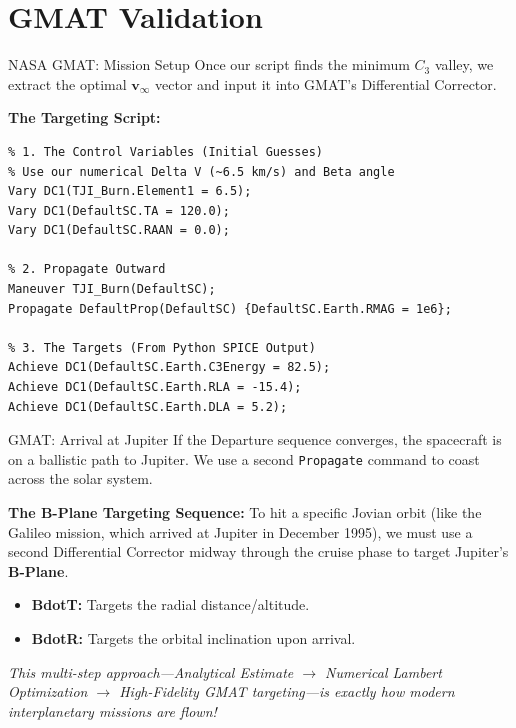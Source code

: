 \documentclass[11pt]{beamer}
\begin{document}
\section{GMAT Validation}

\begin{frame}[fragile]{NASA GMAT: Mission Setup}
    Once our script finds the minimum $C_3$ valley, we extract the optimal $\mathbf{v}_{\infty}$ vector and input it into GMAT's Differential Corrector.
    
    \vspace{0.3cm}
    \textbf{The Targeting Script:}
\begin{lstlisting}
% 1. The Control Variables (Initial Guesses)
% Use our numerical Delta V (~6.5 km/s) and Beta angle
Vary DC1(TJI_Burn.Element1 = 6.5);
Vary DC1(DefaultSC.TA = 120.0);
Vary DC1(DefaultSC.RAAN = 0.0);

% 2. Propagate Outward
Maneuver TJI_Burn(DefaultSC);
Propagate DefaultProp(DefaultSC) {DefaultSC.Earth.RMAG = 1e6};

% 3. The Targets (From Python SPICE Output)
Achieve DC1(DefaultSC.Earth.C3Energy = 82.5);
Achieve DC1(DefaultSC.Earth.RLA = -15.4);
Achieve DC1(DefaultSC.Earth.DLA = 5.2);
\end{lstlisting}
\end{frame}

\begin{frame}{GMAT: Arrival at Jupiter}
    If the Departure sequence converges, the spacecraft is on a ballistic path to Jupiter. We use a second \texttt{Propagate} command to coast across the solar system.
    
    \vspace{0.3cm}
    \textbf{The B-Plane Targeting Sequence:}
    To hit a specific Jovian orbit (like the Galileo mission, which arrived at Jupiter in December 1995), we must use a second Differential Corrector midway through the cruise phase to target Jupiter's \textbf{B-Plane}.
    
    \begin{itemize}
        \item \textbf{BdotT:} Targets the radial distance/altitude.
        \item \textbf{BdotR:} Targets the orbital inclination upon arrival.
    \end{itemize}
    
    \vspace{0.3cm}
    \textit{This multi-step approach—Analytical Estimate $\rightarrow$ Numerical Lambert Optimization $\rightarrow$ High-Fidelity GMAT targeting—is exactly how modern interplanetary missions are flown!}
\end{frame}
\end{document}
